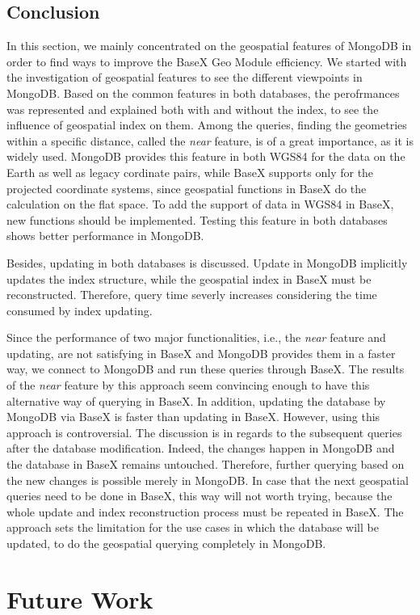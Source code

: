 \documentclass[a4paper,12pt]{article}
\begin{document}
\subsection{Conclusion}
\label{conc}
In this section, we mainly concentrated on the geospatial features of MongoDB in order to find ways to improve the BaseX Geo Module efficiency. We started with the investigation of geospatial features to see the different viewpoints in MongoDB. Based on the common features in both databases, the perofrmances was represented and explained both with and without the index, to see the influence of geospatial index on them.
Among the queries, finding the geometries within a specific distance, called the \textit{near} feature, is of a great importance, as it is widely used. MongoDB provides this feature in both WGS84 for the data on the Earth as well as legacy cordinate pairs, while BaseX supports only for the projected coordinate systems, since geospatial functions in BaseX do the calculation on the flat space. To add the support of data in WGS84 in BaseX, new functions should be implemented. Testing this feature in both databases shows better performance in MongoDB. 

Besides, updating in both databases is discussed. Update in MongoDB implicitly updates the index structure, while the geospatial index in BaseX must be reconstructed. Therefore, query time severly increases considering the time consumed by index updating. 


Since the performance of two major functionalities, i.e., the \textit{near} feature and updating, are not satisfying in BaseX and MongoDB provides them in a faster way, we connect to MongoDB and run these queries through BaseX. The results of the \textit{near} feature by this approach seem convincing enough to have this alternative way of querying in BaseX. In addition, updating the database by MongoDB via BaseX is faster than updating in BaseX. However, using this approach is controversial. The discussion is in regards to the subsequent queries after the database modification. Indeed, the changes happen in MongoDB and the database in BaseX remains untouched. Therefore, further querying based on the new changes is possible merely in MongoDB. In case that the next geospatial queries need to be done in BaseX, this way will not worth trying, because the whole update and index reconstruction process must be repeated in BaseX. The approach sets the limitation for the use cases in which the database will be updated, to do the geospatial querying completely in MongoDB.


\newpage
\section{Future Work}
\label{s.future}
\newpage


\newpage
\listoffigures
\newpage
\listoftables
\newpage
\lstlistoflistings
\end{document}
